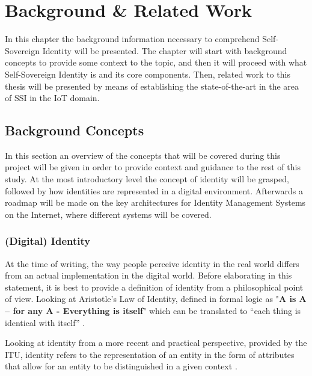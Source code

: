 \section{Background \& Related Work}
\label{sec:background}

In this chapter the background information necessary to comprehend Self-Sovereign Identity will be presented. The chapter will start with background concepts to provide some context to the topic, and then it will proceed with what Self-Sovereign Identity is and its core components. Then, related work to this thesis will be presented by means of establishing the state-of-the-art in the area of SSI in the IoT domain.

\subsection{Background Concepts}
\label{subsec:background_concepts}

In this section an overview of the concepts that will be covered during this project will be given in order to provide context and guidance to the rest of this study. At the most introductory level the concept of identity will be grasped, followed by how identities are represented in a digital environment. Afterwards a roadmap will be made on the key architectures for Identity Management Systems on the Internet, where different systems will be covered.

\subsubsection{(Digital) Identity}
\label{subsubsec:digital_identity}

At the time of writing, the way people perceive identity in the real world differs from an actual implementation in the digital world. Before elaborating in this statement, it is best to provide a definition of identity from a philosophical point of view. Looking at Aristotle's Law of Identity, defined in formal logic as "\textbf{A is A -- for any A - Everything is itself}" which can be translated to “each thing is identical with itself” \cite{Telektronikk}. 

Looking at identity from a more recent and practical perspective, provided by the \acrfull{ITU}, identity refers to the representation of an entity in the form of attributes that allow for an entity to be distinguished in a given context \cite{9789261278519}.

